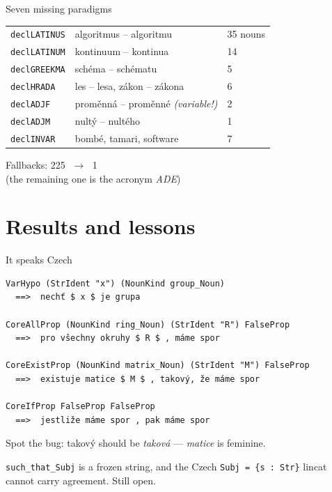 \documentclass[10pt,aspectratio=169]{beamer}
\newcommand{\bad}[1]{\textcolor{warn}{#1}}
\newcommand{\ok}[1]{\textcolor{good}{#1}}
\begin{document}
\begin{frame}{Seven missing paradigms}
  \small
  \begin{center}
  \begin{tabular}{lll}
    \toprule
    \texttt{declLATINUS} & algoritmus -- algoritmu & 35 nouns \\
    \texttt{declLATINUM} & kontinuum -- kontinua & 14 \\
    \texttt{declGREEKMA} & schéma -- schématu & 5 \\
    \texttt{declHRADA}   & les -- lesa, zákon -- zákona & 6 \\
    \texttt{declADJF}    & proměnná -- proměnné \emph{(variable!)} & 2 \\
    \texttt{declADJM}    & nultý -- nultého & 1 \\
    \texttt{declINVAR}   & bombé, tamari, software & 7 \\
    \bottomrule
  \end{tabular}
  \end{center}

  \vspace{1em}
  \begin{center}
  \Large Fallbacks: \bad{225} $\;\longrightarrow\;$ \ok{1} \\
  \normalsize (the remaining one is the acronym \emph{ADE})
  \end{center}
\end{frame}

\section{Results and lessons}

\begin{frame}[fragile]{It speaks Czech}
\begin{lstlisting}
VarHypo (StrIdent "x") (NounKind group_Noun)
  ==>  nechť $ x $ je grupa

CoreAllProp (NounKind ring_Noun) (StrIdent "R") FalseProp
  ==>  pro všechny okruhy $ R $ , máme spor

CoreExistProp (NounKind matrix_Noun) (StrIdent "M") FalseProp
  ==>  existuje matice $ M $ , takový, že máme spor

CoreIfProp FalseProp FalseProp
  ==>  jestliže máme spor , pak máme spor
\end{lstlisting}

  \vspace{0.5em}
  Spot the bug: \bad{takový} should be \emph{taková} --- \emph{matice} is feminine.

  \vspace{0.3em}
  \small \texttt{such\_that\_Subj} is a frozen string, and the Czech
  \texttt{Subj = \{s : Str\}} lincat cannot carry agreement. Still open.
\end{frame}
\end{document}
